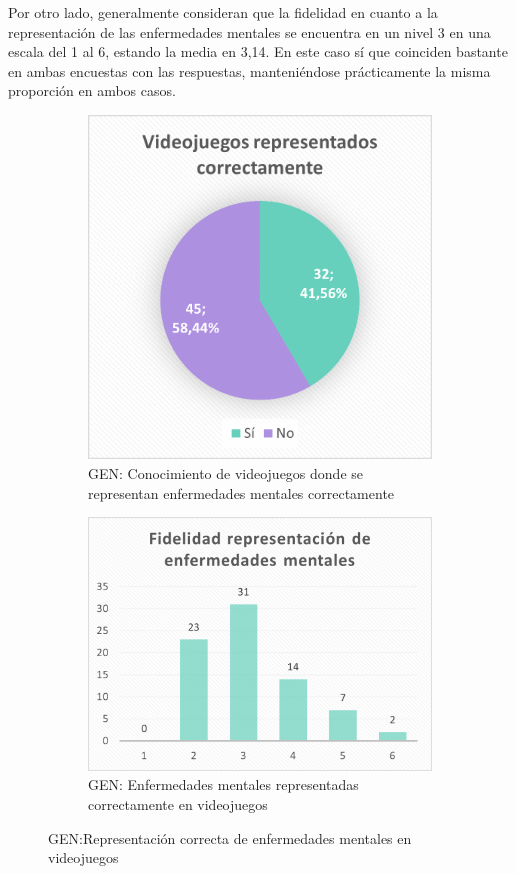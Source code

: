 \documentclass[12pt, a4paper,twoside,titlepage]{book}
\begin{document}
Por otro lado, generalmente consideran que la fidelidad en cuanto a la representación de las enfermedades mentales se encuentra en un nivel 3 en una escala del 1 al 6, estando la media en 3,14. En este caso sí que coinciden bastante en ambas encuestas con las respuestas, manteniéndose prácticamente la misma proporción en ambos casos. 



\begin{figure}
\centering
\begin{subfigure}{.4\textwidth}
  \centering
  \includegraphics[width=.95\linewidth]{Imagenes Form GEN/10GENCorr}
  \caption{GEN: Conocimiento de videojuegos donde se representan enfermedades mentales correctamente}
\end{subfigure}%
\begin{subfigure}{.6\textwidth}
  \centering
  \includegraphics[width=.95\linewidth]{Imagenes Form GEN/11GENFid}
  \caption{GEN: Enfermedades mentales representadas correctamente en videojuegos}
\end{subfigure}
\caption{GEN:Representación correcta de enfermedades mentales en videojuegos}
\label{fig:Enfvid}
\end{figure}
\end{document}

